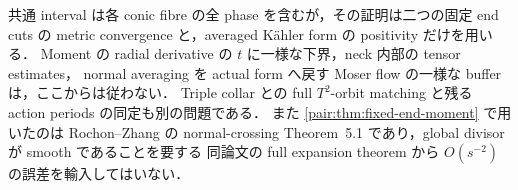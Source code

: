 \begin{remark}
共通 interval は各 conic fibre の全 phase を含むが，その証明は二つの固定 end cuts の
metric convergence と，averaged Kähler form の positivity だけを用いる．
Moment の radial derivative の $t$ に一様な下界，neck 内部の tensor estimates，
normal averaging を actual form へ戻す Moser flow の一様な buffer は，ここからは従わない．
Triple collar との full $T^2$-orbit matching と残る action periods の同定も別の問題である．
また \cref{pair:thm:fixed-end-moment} で用いたのは
Rochon--Zhang の normal-crossing Theorem~5.1 であり，global divisor が smooth であることを要する
同論文の full expansion theorem から $O(s^{-2})$ の誤差を輸入してはいない．
\end{remark}
